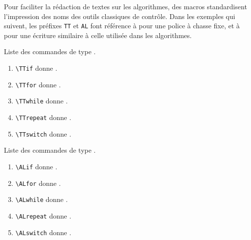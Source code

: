 \documentclass[12pt,a4paper]{article}
\begin{document}
Pour faciliter la rédaction de textes sur les algorithmes, des macros standardisent l'impression des noms des outils classiques de contrôle.
Dans les exemples qui suivent, les préfixes \verb+TT+ et \verb+AL+ font référence à  pour une police à chasse fixe, et à  pour une écriture similaire à celle utilisée dans les algorithmes.



\begin{center}
	Liste des commandes de type .
\end{center}

\begin{enumerate}
    \item \verb+\TTif+ donne \TTif.
    \item \verb+\TTfor+ donne \TTfor.
    \item \verb+\TTwhile+ donne \TTwhile.
    \item \verb+\TTrepeat+ donne \TTrepeat.
    \item \verb+\TTswitch+ donne \TTswitch.
\end{enumerate}

\begin{center}
	Liste des commandes de type .
\end{center}

\begin{enumerate}
    \item \verb+\ALif+ donne \ALif.
    \item \verb+\ALfor+ donne \ALfor.
    \item \verb+\ALwhile+ donne \ALwhile.
    \item \verb+\ALrepeat+ donne \ALrepeat.
    \item \verb+\ALswitch+ donne \ALswitch.
\end{enumerate}

\end{document}
